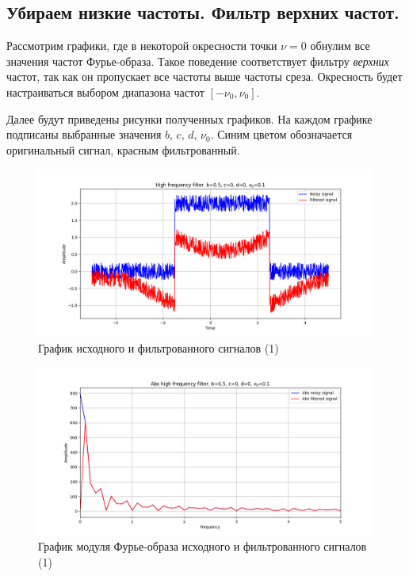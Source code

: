 \documentclass[a4paper, 12pt]{article}
\begin{document}
    \subsection{Убираем низкие частоты. Фильтр верхних частот.}
    Рассмотрим графики, где в некоторой окресности точки $\nu=0$ обнулим все значения частот Фурье-образа.
    Такое поведение соответствует фильтру \textit{верхних} частот, так как он пропускает все частоты выше частоты среза.
    Окресность будет настраиваться выбором диапазона частот $[-\nu_0,\nu_0]$.


    Далее будут приведены рисунки полученных графиков. На каждом графике подписаны выбранные значения $b,\,c,\,d,\,\nu_0$. 
    Синим цветом обозначается оригинальный сигнал, красным фильтрованный.


    \begin{figure}[H]
        \centering
        \includegraphics[scale=0.48]{1_nolow.png}
        \captionsetup{skip=0pt}
        \caption{График исходного и фильтрованного сигналов (1)}
        \label{fig:fig27}
    \end{figure}
    \begin{figure}[H]
        \centering
        \includegraphics[scale=0.48]{1_abs_nolow.png}
        \captionsetup{skip=0pt}
        \caption{График модуля Фурье-образа исходного и фильтрованного сигналов (1)}
        \label{fig:fig28}
    \end{figure}
\end{document}

